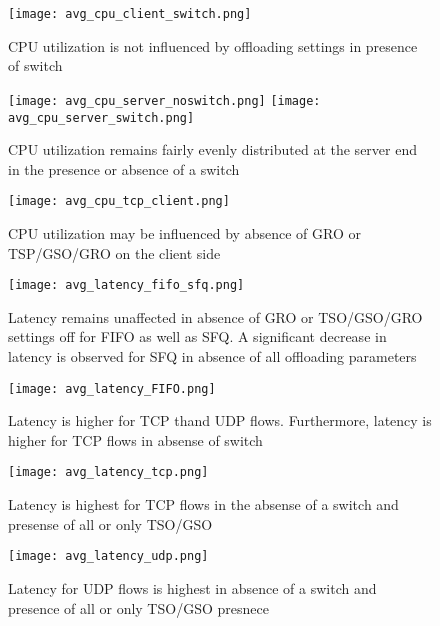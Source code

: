 \begin{figure}[t] \texttt{[image: avg\_cpu\_client\_switch.png]}
\caption{CPU utilization is not influenced by offloading settings in presence of
    switch} \label{fig:avg_cpu_client_switch} \end{figure}


\begin{figure}[t] \texttt{[image: avg\_cpu\_server\_noswitch.png]}
\texttt{[image: avg\_cpu\_server\_switch.png]} \caption{CPU utilization
    remains fairly evenly distributed at the server end in the presence or
        absence of a switch} \label{fig:avg_cpu_server_noswitch} \end{figure}

\begin{figure}[t] \texttt{[image: avg\_cpu\_tcp\_client.png]}
\caption{CPU utilization may be influenced by absence of GRO or TSP/GSO/GRO on
    the client side} \label{fig:avg_cpu_tcp_client} \end{figure}

\begin{figure}[t] \texttt{[image: avg\_latency\_fifo\_sfq.png]}
\caption{Latency remains unaffected in absence of GRO or TSO/GSO/GRO settings
    off for FIFO as well as SFQ. A significant decrease in latency is observed
        for SFQ in absence of all offloading parameters}
        \label{fig:avg_latency_fifo_sfq} \end{figure}


\begin{figure}[t] \texttt{[image: avg\_latency\_FIFO.png]}
\caption{Latency is higher for TCP thand UDP flows. Furthermore, latency is
    higher for TCP flows in absense of switch} \label{fig:avg_latency_FIFO}
    \end{figure}


\begin{figure}[t] \texttt{[image: avg\_latency\_tcp.png]}
\caption{Latency is highest for TCP flows in the absense of a switch and
    presense of all or only TSO/GSO} \label{fig:avg_latency_tcp} \end{figure}


\begin{figure}[t] \texttt{[image: avg\_latency\_udp.png]}
\caption{Latency for UDP flows is highest in absence of a switch and presence of
    all or only TSO/GSO presnece } \label{fig:avg_latency_udp} \end{figure}

